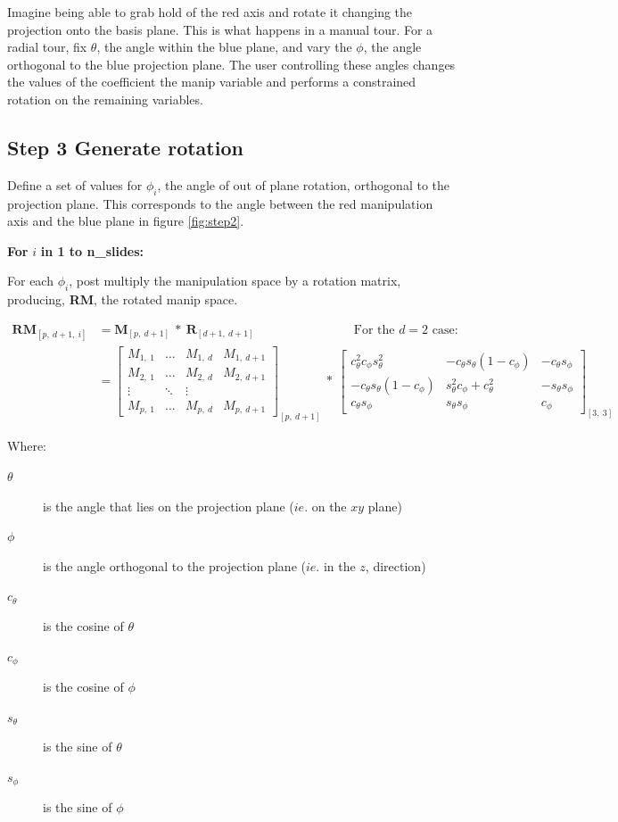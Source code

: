 \documentclass{monashthesis}
\begin{document}
Imagine being able to grab hold of the red axis and rotate it changing
the projection onto the basis plane. This is what happens in a manual
tour. For a radial tour, fix \(\theta\), the angle within the blue
plane, and vary the \(\phi\), the angle orthogonal to the blue
projection plane. The user controlling these angles changes the values
of the coefficient the manip variable and performs a constrained
rotation on the remaining variables.

\subsection{Step 3 Generate rotation}\label{step-3-generate-rotation}

Define a set of values for \(\phi_i\), the angle of out of plane
rotation, orthogonal to the projection plane. This corresponds to the
angle between the red manipulation axis and the blue plane in figure
\ref{fig:step2}.

\textbf{For } \(i\) \textbf{in 1 to n\_slides:}

For each \(\phi_i\), post multiply the manipulation space by a rotation
matrix, producing, \textbf{RM}, the rotated manip space.

\begin{align*}
  \textbf{RM}_{[p,~d+1,~i]}
  &= \textbf{M}_{[p,~d+1]} ~*~ \textbf{R}_{[d+1,~d+1]}
    ~~~~~~~~~~~~~~~~~~~~~~~~~~~~~~~~~~~~\text{For the $d=2$ case:} \\
  &= \begin{bmatrix}
    M_{1,~1} & \dots & M_{1,~d} & M_{1,~d+1} \\
    M_{2,~1} & \dots & M_{2,~d} & M_{2,~d+1} \\
    \vdots   & \ddots& \vdots   \\
    M_{p,~1} & \dots & M_{p,~d} & M_{p,~d+1}
  \end{bmatrix}_{[p,~d+1]}
    ~*~
  \begin{bmatrix}
    c_\theta^2 c_\phi s_\theta^2 &
    -c_\theta s_\theta (1 - c_\phi) &
    -c_\theta s_\phi \\
    -c_\theta s_\theta (1 - c_\phi) &
    s_\theta^2 c_\phi + c_\theta^2 &
    -s_\theta s_\phi \\
    c_\theta s_\phi &
    s_\theta s_\phi &
    c_\phi
  \end{bmatrix}_{[3,~3]}
\end{align*}

Where:

\begin{description}
  \item[$\theta$] is the angle that lies on the projection plane ($ie.$ on the $xy$ plane)
  \item[$\phi$] is the angle orthogonal to the projection plane ($ie.$ in the $z$, direction)
  \item[$c_\theta$] is the cosine of $\theta$
  \item[$c_\phi$]   is the cosine of $\phi$
  \item[$s_\theta$] is the sine of   $\theta$
  \item[$s_\phi$]   is the sine of   $\phi$
\end{description}
\end{document}
